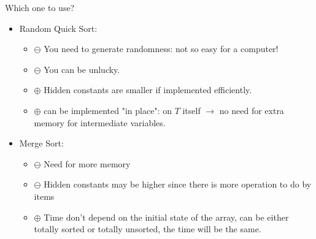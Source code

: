 Which one to use?
\begin{itemize}
\renewcommand{\labelitemi}{$\bullet$}
	\item Random Quick Sort:
	 \begin{itemize}
		\item $\ominus$ You need to generate randomness: not so easy for a computer!
		\item $\ominus$ You can be unlucky.	
		\item $\oplus$ Hidden constants are smaller if implemented efficiently. 
		\item $\oplus$ can be implemented "in place": on $T$ itself $\rightarrow$ no need for extra memory for intermediate variables.
	\end{itemize} 
	\item Merge Sort:
		\begin{itemize}
		\item $\ominus$ Need for more memory
		\item $\ominus$ Hidden constants may be higher since there is more operation to do by items
		\item $\oplus$ Time don't depend on the initial state of the array, can be either totally sorted or totally unsorted, the time will be the same.
		\end{itemize}
	
\end{itemize}